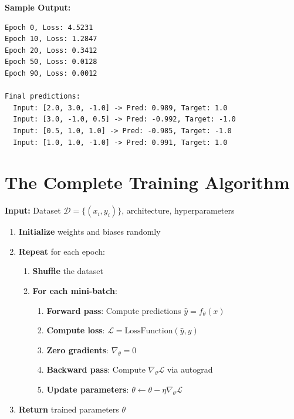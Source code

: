 \textbf{Sample Output:}
\begin{verbatim}
Epoch 0, Loss: 4.5231
Epoch 10, Loss: 1.2847
Epoch 20, Loss: 0.3412
Epoch 50, Loss: 0.0128
Epoch 90, Loss: 0.0012

Final predictions:
  Input: [2.0, 3.0, -1.0] -> Pred: 0.989, Target: 1.0
  Input: [3.0, -1.0, 0.5] -> Pred: -0.992, Target: -1.0
  Input: [0.5, 1.0, 1.0] -> Pred: -0.985, Target: -1.0
  Input: [1.0, 1.0, -1.0] -> Pred: 0.991, Target: 1.0
\end{verbatim}

\section{The Complete Training Algorithm}

\begin{algorithm}
\textbf{Input:} Dataset $\mathcal{D} = \{(x_i, y_i)\}$, architecture, hyperparameters

\begin{enumerate}
    \item \textbf{Initialize} weights and biases randomly
    \item \textbf{Repeat} for each epoch:
    \begin{enumerate}
        \item \textbf{Shuffle} the dataset
        \item \textbf{For each mini-batch}:
        \begin{enumerate}
            \item \textbf{Forward pass}: Compute predictions $\hat{y} = f_\theta(x)$
            \item \textbf{Compute loss}: $\mathcal{L} = \text{LossFunction}(\hat{y}, y)$
            \item \textbf{Zero gradients}: $\nabla_\theta = 0$
            \item \textbf{Backward pass}: Compute $\nabla_\theta \mathcal{L}$ via autograd
            \item \textbf{Update parameters}: $\theta \leftarrow \theta - \eta \nabla_\theta \mathcal{L}$
        \end{enumerate}
    \end{enumerate}
    \item \textbf{Return} trained parameters $\theta$
\end{enumerate}
\end{algorithm}

